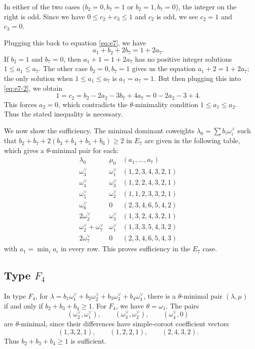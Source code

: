 \documentclass[a4paper, 12pt]{amsart}
\theoremstyle{definition}
\begin{document}
In either of the two cases ($b_2=0, b_7=1$ or $b_2=1, b_7=0$), the integer on the right is odd. Since we have $0 \leq c_2 + c_3 \leq 1$ and $c_2$ is odd, we see $c_2=1$ and $c_3=0$.


Plugging this back to equation \ref{eq:e7}, we have 
\[a_1+b_2+2b_7=1+2a_7.\]
If $b_2=1$ and $b_7=0$, then $a_1+1=1+2a_7$ has no positive integer solutions $1 \leq a_1 \leq a_7$. The other case $b_2=0, b_7=1$ gives us the equation $a_1+2=1+2a_7$; the only solution when $1 \leq a_1 \leq a_7$ is $a_1=a_7=1$. But then plugging this into \ref{eq:e7-2}, we obtain 
\[1= c_2 = b_2-2a_2-3b_7+4a_7=0-2a_2-3+4.\]
This forces $a_2=0$, which contradicts the $\theta$-minimality condition $1 \leq a_1 \leq a_2$.
Thus the stated inequality is necessary.


We now show the sufficiency. The minimal dominant coweights $\lambda_0=\sum b_i \omega_i^{\vee}$ such that $b_2+b_7+2(b_3+b_4+b_5+b_6) \geq 2$ in $E_7$ are given in the following table, which gives a $\theta$-minimal pair for each:
\[
\begin{array}{c|c|c}
\lambda_0&\mu_0&(a_1,\ldots,a_7)\\ \hline
\omega_3^\vee&\omega_1^\vee&(1,2,3,4,3,2,1)\\
\omega_4^\vee&\omega_3^\vee&(1,2,2,4,3,2,1)\\
\omega_5^\vee&\omega_2^\vee&(1,1,2,3,3,2,1)\\
\omega_6^\vee&0&(2,3,4,6,5,4,2)\\
2\omega_2^\vee&\omega_3^\vee&(1,3,2,4,3,2,1)\\
\omega_2^\vee+\omega_7^\vee&\omega_1^\vee&(1,3,3,5,4,3,2)\\
2\omega_7^\vee&0&(2,3,4,6,5,4,3)
\end{array}
\]
with $a_1=\min_i a_i$ in every row. This proves sufficiency in the $E_7$ case.

\subsection{Type $F_4$}\label{app:classification-F} In type $F_4$, for $\lambda = b_1\omega_1^{\vee}+b_2\omega_2^{\vee}+b_3\omega_3^{\vee}+b_4 \omega_4^{\vee}$, there is a $\theta$-minimal pair $(\lambda,\mu)$ if and only if $b_2+b_3+b_4 \geq 1$.
For $F_4$, we have $\theta=\omega_1$. The pairs
\[
(\omega_2^\vee,\omega_1^\vee),\qquad
(\omega_3^\vee,\omega_2^\vee),\qquad
(\omega_4^\vee,0)
\]
are $\theta$-minimal, since their differences have simple-coroot coefficient vectors
\[
(1,3,2,1),\qquad (1,2,2,1),\qquad (2,4,3,2).
\]
Thus $b_2+b_3+b_4\ge1$ is sufficient. 
\end{document}

